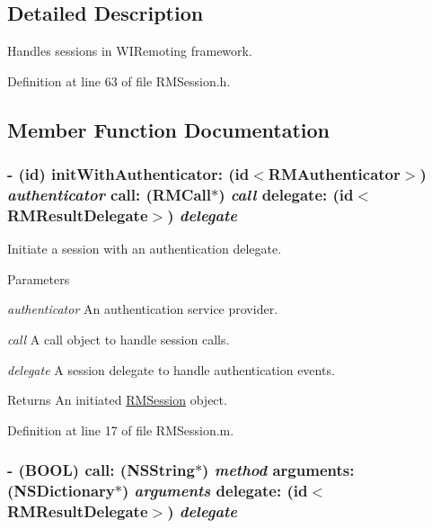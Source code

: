 \subsection{Detailed Description}
Handles sessions in WIRemoting framework. 

Definition at line 63 of file RMSession.h.

\subsection{Member Function Documentation}
\hypertarget{interface_r_m_session_ac0cd1eaf70a3afee073b376773d915ff}{
\subsubsection[{initWithAuthenticator:call:delegate:}]{\setlength{\rightskip}{0pt plus 5cm}-\/ (id) initWithAuthenticator: (id$<${\bf RMAuthenticator}$>$) {\em authenticator}\/ call: ({\bf RMCall}$\ast$) {\em call}\/ delegate: (id$<${\bf RMResultDelegate}$>$) {\em delegate}}}
\label{interface_r_m_session_ac0cd1eaf70a3afee073b376773d915ff}


Initiate a session with an authentication delegate. 
\begin{DoxyParams}{Parameters}
\item[{\em authenticator}]An authentication service provider. \item[{\em call}]A call object to handle session calls. \item[{\em delegate}]A session delegate to handle authentication events.\end{DoxyParams}
\begin{DoxyReturn}{Returns}
An initiated \hyperlink{interface_r_m_session}{RMSession} object. 
\end{DoxyReturn}


Definition at line 17 of file RMSession.m.\hypertarget{interface_r_m_session_a898ba9b048b6568b051acde8d2f48749}{
\subsubsection[{call:arguments:delegate:}]{\setlength{\rightskip}{0pt plus 5cm}-\/ (BOOL) call: (NSString$\ast$) {\em method}\/ arguments: (NSDictionary$\ast$) {\em arguments}\/ delegate: (id$<${\bf RMResultDelegate}$>$) {\em delegate}}}
\label{interface_r_m_session_a898ba9b048b6568b051acde8d2f48749}


